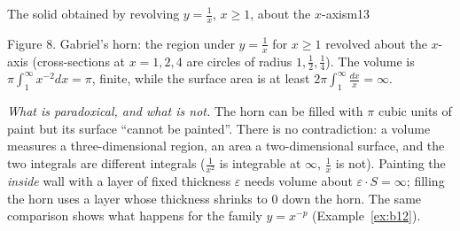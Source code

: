 \documentclass[11pt]{article}
\begin{document}
\begin{exmp}{The solid obtained by revolving $y=\frac1x$, $x\ge1$, about the $x$-axis}{m13}
\begin{center}
\end{center}
\begin{center}\small Figure 8. Gabriel's horn: the region under $y=\frac1x$ for $x\ge1$ revolved about the $x$-axis (cross-sections at $x=1,2,4$ are circles of radius $1,\frac12,\frac14$). The volume is $\pi\int_1^\infty x^{-2}dx=\pi$, finite, while the surface area is at least $2\pi\int_1^\infty\frac{dx}x=\infty$.\end{center}

\emph{What is paradoxical, and what is not.} The horn can be filled with $\pi$ cubic units of paint but its surface ``cannot be painted''. There is no contradiction: a volume measures a three-dimensional region, an area a two-dimensional surface, and the two integrals are different integrals ($\frac1{x^2}$ is integrable at $\infty$, $\frac1x$ is not). Painting the \emph{inside} wall with a layer of fixed thickness $\varepsilon$ needs volume about $\varepsilon\cdot S=\infty$; filling the horn uses a layer whose thickness shrinks to $0$ down the horn. The same comparison shows what happens for the family $y=x^{-p}$ (Example~\ref{ex:b12}).
\end{exmp}
\end{document}
